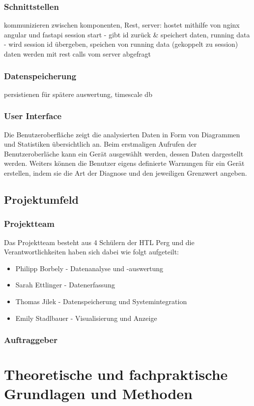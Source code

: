 \documentclass{report}
\begin{document}
\subsection{Schnittstellen}
kommunizieren zwischen komponenten, Rest, server: hostet mithilfe von nginx angular und fastapi
session start - gibt id zurück & speichert daten, running data - wird session id übergeben, speichen von running data (gekoppelt zu session)
daten werden mit rest calls vom server abgefragt
\subsection{Datenspeicherung}
persistienen für spätere auswertung, timescale db 
\subsection{User Interface}
Die Benutzeroberfläche zeigt die analysierten Daten in Form von Diagrammen und Statistiken übersichtlich an. Beim erstmaligen Aufrufen der Benutzeroberläche kann ein Gerät ausgewählt werden, dessen Daten dargestellt werden. Weiters können die Benutzer eigens definierte Warnungen für ein Gerät erstellen, indem sie die Art der Diagnose und den jeweiligen Grenzwert angeben.
\section{Projektumfeld}
\subsection{Projektteam}
Das Projektteam besteht aus 4 Schülern der HTL Perg und die Verantwortlichkeiten haben sich dabei wie folgt aufgeteilt:
\begin{itemize}
    \item Philipp Borbely - Datenanalyse und -auswertung
    \item Sarah Ettlinger - Datenerfassung
    \item Thomas Jilek - Datenspeicherung und Systemintegration
    \item Emily Stadlbauer - Visualisierung und Anzeige
\end{itemize}

\subsection{Auftraggeber}

\chapter{Theoretische und fachpraktische Grundlagen und Methoden}
\end{document}
